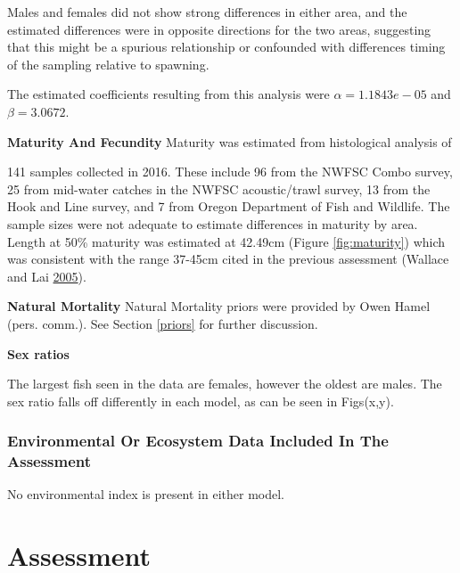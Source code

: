 \documentclass[12pt,]{article}
\begin{document}
Males and females did not show strong differences in either area, and
the estimated differences were in opposite directions for the two areas,
suggesting that this might be a spurious relationship or confounded with
differences timing of the sampling relative to spawning.

The estimated coefficients resulting from this analysis were
\(\alpha = 1.1843e-05\) and \(\beta = 3.0672\).

\vspace{.5cm}

\textbf{Maturity And Fecundity} Maturity was estimated from histological
analysis of

141 samples collected in 2016. These include 96 from the NWFSC Combo
survey, 25 from mid-water catches in the NWFSC acoustic/trawl survey, 13
from the Hook and Line survey, and 7 from Oregon Department of Fish and
Wildlife. The sample sizes were not adequate to estimate differences in
maturity by area. Length at 50\% maturity was estimated at 42.49cm
(Figure \ref{fig:maturity}) which was consistent with the range 37-45cm
cited in the previous assessment (Wallace and Lai
\protect\hyperlink{ref-Wallace2005}{2005}).

\vspace{.5cm}

\textbf{Natural Mortality} Natural Mortality priors were provided by
Owen Hamel (pers. comm.). See Section \ref{priors} for further
discussion.

\vspace{.5cm}

\textbf{Sex ratios}

The largest fish seen in the data are females, however the oldest are
males. The sex ratio falls off differently in each model, as can be seen
in Figs(x,y).

\subsubsection{Environmental Or Ecosystem Data Included In The
Assessment}\label{environmental-or-ecosystem-data-included-in-the-assessment}

No environmental index is present in either model.

\newpage

\section{Assessment}\label{assessment}
\end{document}
